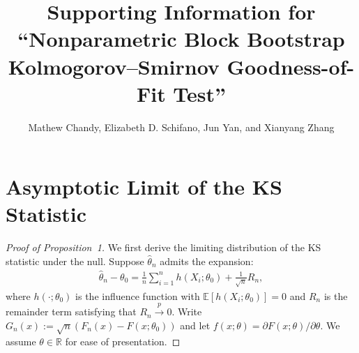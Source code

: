 \documentclass[12pt]{article}
\title{Supporting Information for
  ``Nonparametric Block Bootstrap Kolmogorov--Smirnov Goodness-of-Fit
  Test''}
\author{Mathew Chandy, Elizabeth D. Schifano, Jun Yan, and Xianyang
  Zhang}
\begin{document}
\maketitle


\section{Asymptotic Limit of the KS Statistic}

\begin{proof}[Proof of Proposition~1]
We first derive the limiting distribution of the KS statistic under the null. 
Suppose $\hat{\theta}_n$ admits the expansion:
\begin{align}\label{eq-expan}
\hat{\theta}_n-\theta_0 = \frac{1}{n}\sum^{n}_{i=1}h(X_i;\theta_0) + 
\frac{1}{\sqrt{n}}R_n,    
\end{align}
where $h(\cdot;\theta_0)$ is the influence function with 
$\mathbb{E}[h(X_i;\theta_0)]=0$ and $R_n$ is the remainder term satisfying that
$R_n\overset{p}{\rightarrow} 0.$ Write $G_n(x):=\sqrt{n}(F_n(x) - 
F(x; \theta_0))$ 
and let $f(x;\theta)=\partial F(x;\theta)/\partial \theta$. We assume 
$\theta \in \mathbb{R}$ for ease of presentation.



\end{proof}
\end{document}
